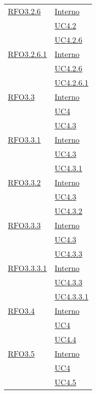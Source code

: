\begin{longtable}{|>{\centering}m{5cm}|m{5cm}<{\centering}|}
\hyperlink{RFO3.2.6}{RFO3.2.6} & \hyperlink{Interno}{Interno}\\
& \hyperref[UC4.2]{UC4.2}\\
& \hyperref[UC4.2.6]{UC4.2.6}\\ \hline

\hyperlink{RFO3.2.6.1}{RFO3.2.6.1} & \hyperlink{Interno}{Interno}\\
& \hyperref[UC4.2.6]{UC4.2.6}\\
& \hyperref[UC4.2.6.1]{UC4.2.6.1}\\ \hline

\hyperlink{RFO3.3}{RFO3.3} & \hyperlink{Interno}{Interno}\\
& \hyperref[UC4]{UC4}\\
& \hyperref[UC4.3]{UC4.3}\\ \hline

\hyperlink{RFO3.3.1}{RFO3.3.1} & \hyperlink{Interno}{Interno}\\
& \hyperref[UC4.3]{UC4.3}\\
& \hyperref[UC4.3.1]{UC4.3.1}\\ \hline

\hyperlink{RFO3.3.2}{RFO3.3.2} & \hyperlink{Interno}{Interno}\\
& \hyperref[UC4.3]{UC4.3}\\
& \hyperref[UC4.3.2]{UC4.3.2}\\ \hline

\hyperlink{RFO3.3.3}{RFO3.3.3} & \hyperlink{Interno}{Interno}\\
& \hyperref[UC4.3]{UC4.3}\\
& \hyperref[UC4.3.3]{UC4.3.3}\\ \hline

\hyperlink{RFO3.3.3.1}{RFO3.3.3.1} & \hyperlink{Interno}{Interno}\\
& \hyperref[UC4.3.3]{UC4.3.3}\\
& \hyperref[UC4.3.3.1]{UC4.3.3.1}\\ \hline

\hyperlink{RFO3.4}{RFO3.4} & \hyperlink{Interno}{Interno}\\
& \hyperref[UC4]{UC4}\\
& \hyperref[UC4.4]{UC4.4}\\ \hline

\hyperlink{RFO3.5}{RFO3.5} & \hyperlink{Interno}{Interno}\\
& \hyperref[UC4]{UC4}\\
& \hyperref[UC4.5]{UC4.5}\\ \hline


\end{longtable}
